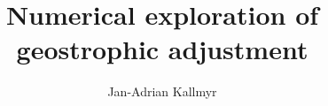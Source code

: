 \documentclass[a4paper, 11pt, twocolumn]{article}
\begin{document}
\title{Numerical exploration of geostrophic adjustment}

\author{Jan-Adrian Kallmyr}

\twocolumn[
  \begin{@twocolumnfalse}
    \maketitle
%    
  \end{@twocolumnfalse}
]












%

%
\end{document}
